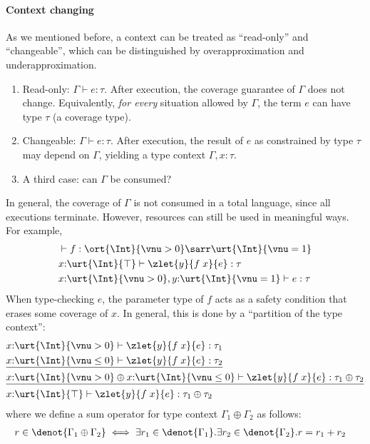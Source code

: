 \paragraph{Context changing} As we mentioned before, a context can be treated as ``read-only'' and ``changeable'', which can be distinguished by overapproximation and underapproximation.
\begin{enumerate}
  \item Read-only: $\Gamma \vdash e : \tau$. After execution, the coverage guarantee of $\Gamma$ does not change. Equivalently, \emph{for every} situation allowed by $\Gamma$, the term $e$ can have type $\tau$ (a coverage type).
  \item Changeable: $\Gamma \vdash e : \tau$. After execution, the result of $e$ as constrained by type $\tau$ may depend on $\Gamma$, yielding a type context $\Gamma, x{:}\tau$.
  \item A third case: can $\Gamma$ be consumed?
\end{enumerate}
In general, the coverage of $\Gamma$ is not consumed in a total language, since all executions terminate. However, resources can still be used in meaningful ways. For example,
\begin{align*}
  &\vdash f : \ort{\Int}{\vnu > 0} \sarr \urt{\Int}{\vnu = 1}
  \\&x{:}\urt{\Int}{\top} \vdash \zlet{y}{f\;x}{e} : \tau
  \\&x{:}\urt{\Int}{\vnu > 0}, y{:}\urt{\Int}{\vnu = 1} \vdash e : \tau
\end{align*}\noindent
When type-checking $e$, the parameter type of $f$ acts as a safety condition that erases some coverage of $x$. In general, this is done by a ``partition of the type context'':
\begin{align*}
  &x{:}\urt{\Int}{\vnu > 0} \vdash \zlet{y}{f\;x}{e} : \tau_1
  \\&\underline{x{:}\urt{\Int}{\vnu \leq 0} \vdash \zlet{y}{f\;x}{e} : \tau_2}
  \\&\underline{x{:}\urt{\Int}{\vnu > 0} \oplus x{:}\urt{\Int}{\vnu \leq 0} \vdash \zlet{y}{f\;x}{e} : \tau_1 \oplus \tau_2}
  \\&x{:}\urt{\Int}{\top} \vdash \zlet{y}{f\;x}{e} : \tau_1 \oplus \tau_2
\end{align*}\noindent
where we define a sum operator for type context $\Gamma_1 \oplus \Gamma_2$ as follows:
\begin{align*}
  r \in \denot{\Gamma_1 \oplus \Gamma_2} &\iff \exists r_1 \in \denot{\Gamma_1}. \exists r_2 \in \denot{\Gamma_2}. r = r_1 + r_2
\end{align*}\noindent
